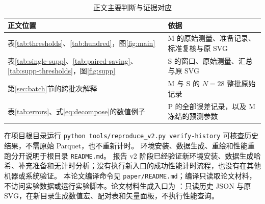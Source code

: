 \documentclass[UTF8,a4paper,zihao=-4,fontset=none]{ctexart}
\newcommand{\code}[1]{{\small\texttt{#1}}}
\begin{document}
\begin{table}[htbp]
\centering\small
\caption{正文主要判断与证据对应}\label{tab:map}
\begin{tabularx}{\linewidth}{@{}lY@{}}
\toprule
正文位置 & 依据\\
\midrule
表\ref{tab:thresholds}、\ref{tab:hundred}，图\ref{fig:main} & M 的原始测量、准备记录、标准复核与原 SVG\\
表\ref{tab:single-supp}、\ref{tab:paired-saving}、\ref{tab:supp-thresholds}，图\ref{fig:supp} & S 的窗口、原始测量、汇总与原 SVG\\
第\ref{sec:batch}节的跨批次解释 & M 与 S 的 $N=28$ 整批原始记录\\
表\ref{tab:errors}、式\eqref{eq:decompose}的数值例子 & P 的全部误差记录，以及 M 冻结的预测参数\\
\bottomrule
\end{tabularx}
\end{table}

在项目根目录运行 \code{python tools/reproduce\_v2.py verify-history} 可核查历史结果，不需原始 Parquet，也不重新计时。
环境安装、数据生成、重绘和性能重跑分开说明于根目录 \code{README.md}。
报告 v2 阶段已经验证新环境安装、数据生成哈希、补充准备和无计时分析；没有执行新入口的成功性能计时流程，也没有在其他机器或系统验证。
本论文编译命令见 \code{paper/README.md}；编译只读取论文材料，不访问实验数据或运行实验脚本。论文材料生成入口为 ：只读历史 JSON 与原 SVG，在新目录生成数值宏、配对表和矢量面板，不执行性能查询。
\end{document}
